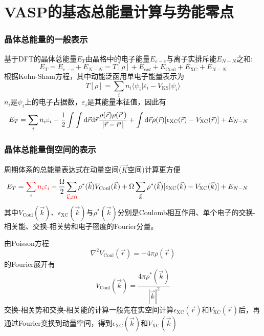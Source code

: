 \documentclass[cjk,slidestop,handout,compress,mathserif,blue]{beamer}	%
\begin{document}
\section{\rm{VASP}的基态总能量计算与势能零点}
\frame
{
	\frametitle{晶体总能量的一般表示}
基于\textrm{DFT}的晶体总能量$E_T$由晶格中的电子能量$E_{e-e}$与离子实排斥能$E_{N-N}$之和:~
	\begin{displaymath}
		E_T=E_{e-e}+E_{N-N}=T[\rho]+E_{ext}+E_{\mathrm{Coul}}+E_{\mathrm{XC}}+E_{N-N}
	\end{displaymath}
根据\textrm{Kohn-Sham}方程，其中动能泛函用单电子能量表示为
\begin{displaymath}
	T[{\rho}]=\sum_in_i\langle\psi_i|\varepsilon_i-V_{\mathrm{KS}}|\psi_i\rangle
\end{displaymath}
$n_i$是$\psi_i$上的电子占据数，$\varepsilon_i$是其能量本征值，因此有
\begin{displaymath}
	\hspace*{-12.0pt}	E_T=\sum_in_i\varepsilon_i-\dfrac12\int\int\mathrm{d}\vec r\mathrm{d}\vec r\dfrac{\rho(\vec r)\rho(\vec r^{\prime})}{|\vec r-\vec r^{\prime}|}+\int\mathrm{d}\vec r\rho(\vec r)[\epsilon_{\mathrm{XC}}(\vec r)-V_{\mathrm{XC}}(\vec r)]+E_{N-N}
\end{displaymath}
}

\frame
{
	\frametitle{晶体总能量倒空间的表示}
周期体系的总能量表达式在动量空间($\vec K$空间)计算更方便
\begin{displaymath}
	\hspace*{-15.0pt}	E_T=\textcolor{red}{\sum_in_i\varepsilon_i}-\dfrac{\Omega}2\sum_{\textcolor{red}{\vec k\neq 0}}\rho^{\ast}(\vec k)V_{\mathrm{Coul}}(\vec k)+\Omega\sum_{\vec k}\rho^{\ast}(\vec k)[\epsilon_{\mathrm{XC}}(\vec k)-V_{\mathrm{XC}}(\vec k)]+E_{N-N}
\end{displaymath}
其中$V_{\mathrm{Coul}}(\vec k)$、$\epsilon_{\mathrm{XC}}(\vec k)$与$\rho^{\ast}(\vec k)$分别是\textrm{Coulomb}相互作用、单个电子的交换-相关能、交换-相关势和电子密度的\textrm{Fourier}分量。

由\textrm{Poisson}方程
\begin{displaymath}
	\nabla^2V_{\mathrm{Coul}}(\vec r)=-4\pi\rho(\vec r)
\end{displaymath}
的\textrm{Fourier}展开有
\begin{displaymath}
	V_{\mathrm{Coul}}(\vec k)=\dfrac{4\pi\rho^{\ast}(\vec k)}{|\vec k|^2}
\end{displaymath}
交换-相关势和交换-相关能的计算一般先在实空间计算$\epsilon_{\mathrm{XC}}(\vec r)$和$V_{\mathrm{XC}}(\vec r)$后，再通过\textrm{Fourier}变换到动量空间，得到$\epsilon_{\mathrm{XC}}(\vec k)$和$V_{\mathrm{XC}}(\vec k)$
}
\end{document}
